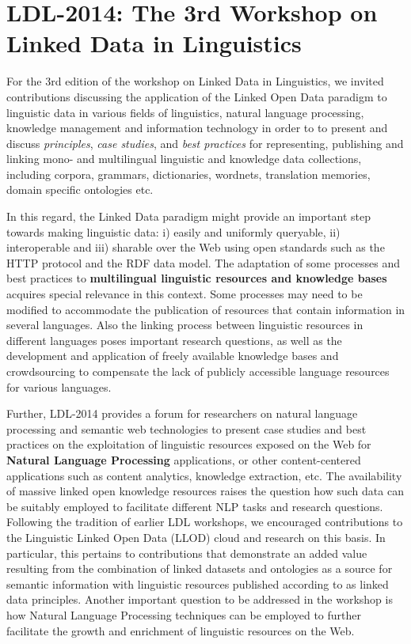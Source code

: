 \section{LDL-2014: The 3rd Workshop on Linked Data in Linguistics}

For the 3rd edition of the workshop on Linked Data in Linguistics, we invited contributions discussing the application of the Linked Open Data paradigm to linguistic data in various fields of linguistics, natural language processing, knowledge management and information technology in order to to present and discuss \emph{principles}, \emph{case studies}, and \emph{best practices} for representing, publishing and linking mono- and multilingual linguistic and knowledge data collections, including corpora, grammars, dictionaries, wordnets, translation memories, domain specific ontologies etc. 

In this regard, the Linked Data paradigm might provide an important step towards making linguistic data: i) easily and uniformly queryable, ii) interoperable and iii) sharable over the Web using open standards such as the HTTP protocol and the RDF data model. The adaptation of some processes and best practices to \textbf{multilingual linguistic resources and knowledge bases} acquires special relevance in this context. Some processes may need to be modified to accommodate the publication of resources that contain information in several languages. Also the linking process between linguistic resources in different languages poses important research questions, as well as the development and application of freely available knowledge bases and crowdsourcing to compensate the lack of publicly accessible language resources for various languages.

Further, LDL-2014 provides a forum for researchers on natural language processing and semantic web technologies to present case studies and best practices on the exploitation of linguistic resources exposed on the Web for \textbf{Natural Language Processing} applications, or other content-centered applications such as content analytics, knowledge extraction, etc. The availability of massive linked open knowledge resources raises the question how such data can be suitably employed to facilitate different NLP tasks and research questions. Following the tradition of earlier LDL workshops, we encouraged contributions to the Linguistic Linked Open Data (LLOD) cloud and research on this basis. In particular, this pertains to contributions that demonstrate an added value resulting from the combination of linked datasets and ontologies as a source for semantic information with linguistic resources published according to as linked data principles. Another important question to be addressed in the workshop is how Natural Language Processing techniques can be employed to further facilitate the growth and enrichment of linguistic resources on the Web.

